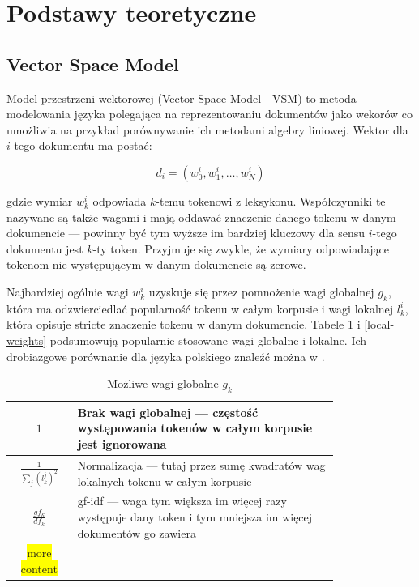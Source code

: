 \documentclass[11pt,a4paper]{article}
\newcommand{\todo}[1]{\colorbox{yellow}{#1}}
\begin{document}
\pagebreak

\section{Podstawy teoretyczne}
\subsection{Vector Space Model}

\label{weighting-theory} Model przestrzeni wektorowej (Vector Space Model -
VSM) to metoda modelowania języka polegająca na reprezentowaniu dokumentów jako
wekorów co umożliwia na przykład porównywanie ich metodami algebry liniowej.
Wektor dla $i$-tego dokumentu ma postać:

\begin{equation}
d_i = (w^i_0, w^i_1, \ldots, w^i_N)
\end{equation}

gdzie wymiar $w^i_k$ odpowiada $k$-temu tokenowi z leksykonu. Współczynniki te
nazywane są także wagami i mają oddawać znaczenie danego tokenu w danym
dokumencie --- powinny być tym wyższe im bardziej kluczowy dla sensu $i$-tego
dokumentu jest $k$-ty token. Przyjmuje się zwykle, że wymiary odpowiadające
tokenom nie występującym w danym dokumencie są zerowe.

Najbardziej ogólnie wagi $w^i_k$ uzyskuje się przez pomnożenie wagi globalnej
$g_k$, która ma odzwierciedlać popularność tokenu w całym korpusie i wagi
lokalnej $l^i_k$, która opisuje stricte znaczenie tokenu w danym dokumencie.
Tabele \ref{global-weights} i \ref{local-weights} podsumowują popularnie
stosowane wagi globalne i lokalne. Ich drobiazgowe porównanie dla języka
polskiego znaleźć można w \cite{figiel}.

\begin{table}[h]
\caption{Możliwe wagi globalne $g_k$}
\label{global-weights}
\begin{tabular}[c]{|c|p{0.8\linewidth}|}
\hline
$1$ & Brak wagi globalnej --- częstość występowania tokenów w całym korpusie jest ignorowana \\\hline
$\frac{1}{\sum_j (l^j_k)^2}$ & Normalizacja --- tutaj przez sumę kwadratów wag lokalnych tokenu w całym korpusie\\\hline
$\frac{gf_k}{df_k}$ & gf-idf --- waga tym większa im więcej razy występuje dany token i tym mniejsza im więcej dokumentów go zawiera\\\hline
\hline
\todo{more content}
\end{tabular}
\end{table}
\end{document}
